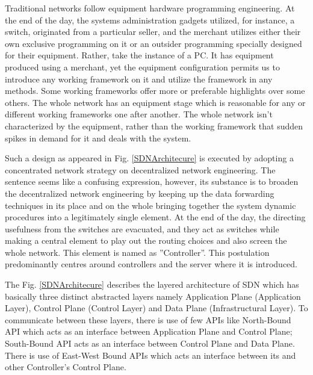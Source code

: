     Traditional networks follow equipment hardware programming engineering. At the end of the day, the systems administration gadgets utilized, for instance, a switch, originated from a particular seller, and the merchant utilizes either their own exclusive programming on it or an outsider programming specially designed for their equipment. Rather, take the instance of a PC. It has equipment produced using a merchant, yet the equipment configuration permits us to introduce any working framework on it and utilize the framework in any methods. Some working frameworks offer more or preferable highlights over some others.
     The whole network has an equipment stage which is reasonable for any or different working frameworks one after another. The whole network isn't characterized by the equipment, rather than the working framework that sudden spikes in demand for it and deals with the system.
    
    Such a design as appeared in Fig. \ref{SDNArchitecure} is executed by adopting a concentrated network strategy on decentralized network engineering. The sentence seems like a confusing expression, however, its substance is to broaden the decentralized network engineering by keeping up the data forwarding techniques in its place and on the whole bringing together the system dynamic procedures into a legitimately single element. At the end of the day, the directing usefulness from the switches are evacuated, and they act as switches while making a central element to play out the routing choices and also screen the whole network. This element is named as ''Controller''. This postulation predominantly centres around controllers and the server where it is introduced.
    
    The Fig. \ref{SDNArchitecure} describes the layered architecture of SDN which has basically three distinct abstracted layers namely Application Plane (Application Layer), Control Plane (Control Layer) and Data Plane (Infrastructural Layer). To communicate between these layers, there is use of few APIs like North-Bound API which acts as an interface between Application Plane and Control Plane; South-Bound API acts as an interface between Control Plane and Data Plane. There is use of East-West Bound APIs which acts an interface between its and other Controller's Control Plane.
    
